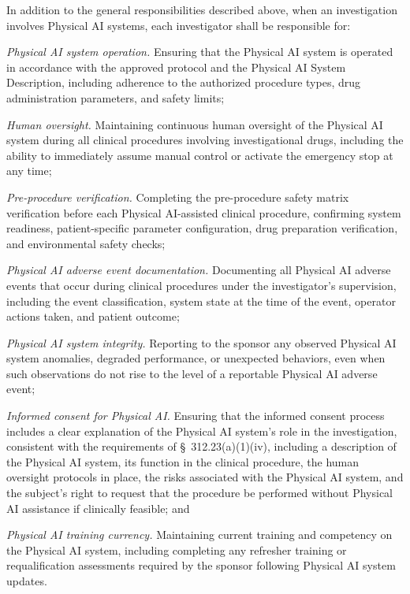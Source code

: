 In addition to the general responsibilities described above, when an investigation involves Physical AI systems, each investigator shall be responsible for:

\begin{description}[leftmargin=0.8cm,style=sameline]
\item[(a)] \textit{Physical AI system operation.} Ensuring that the Physical AI system is operated in accordance with the approved protocol and the Physical AI System Description, including adherence to the authorized procedure types, drug administration parameters, and safety limits;
\item[(b)] \textit{Human oversight.} Maintaining continuous human oversight of the Physical AI system during all clinical procedures involving investigational drugs, including the ability to immediately assume manual control or activate the emergency stop at any time;
\item[(c)] \textit{Pre-procedure verification.} Completing the pre-procedure safety matrix verification before each Physical AI-assisted clinical procedure, confirming system readiness, patient-specific parameter configuration, drug preparation verification, and environmental safety checks;
\item[(d)] \textit{Physical AI adverse event documentation.} Documenting all Physical AI adverse events that occur during clinical procedures under the investigator's supervision, including the event classification, system state at the time of the event, operator actions taken, and patient outcome;
\item[(e)] \textit{Physical AI system integrity.} Reporting to the sponsor any observed Physical AI system anomalies, degraded performance, or unexpected behaviors, even when such observations do not rise to the level of a reportable Physical AI adverse event;
\item[(f)] \textit{Informed consent for Physical AI.} Ensuring that the informed consent process includes a clear explanation of the Physical AI system's role in the investigation, consistent with the requirements of \S~312.23(a)(1)(iv), including a description of the Physical AI system, its function in the clinical procedure, the human oversight protocols in place, the risks associated with the Physical AI system, and the subject's right to request that the procedure be performed without Physical AI assistance if clinically feasible; and
\item[(g)] \textit{Physical AI training currency.} Maintaining current training and competency on the Physical AI system, including completing any refresher training or requalification assessments required by the sponsor following Physical AI system updates.
\end{description}

